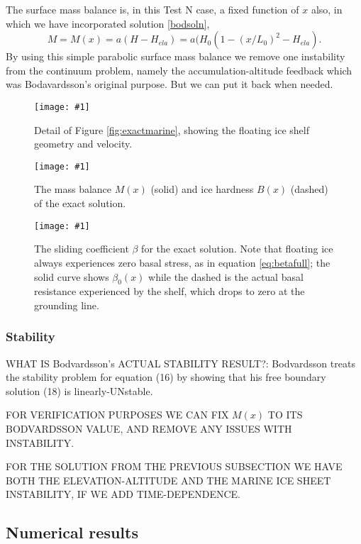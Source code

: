 \documentclass[twocolumn,letterpaper]{igs}
\newcommand{\onecol}[1]{\texttt{[image: \#1]}}
\begin{document}
The surface mass balance is, in this Test N case, a fixed function of $x$ also, in which we have incorporated solution \eqref{bodsoln},
	$$M = M(x) = a(H-H_{ela}) = a(H_0(1 - (x/L_0)^2 - H_{ela}).$$
By using this simple parabolic surface mass balance we remove one instability from the continuum problem, namely the accumulation-altitude feedback which was Bodavardsson's original purpose.  But we can put it back when needed.

\begin{figure}[ht]
\onecol{exactmarine-geometry-detail}
\caption{Detail of Figure \ref{fig:exactmarine}, showing the floating ice shelf geometry and velocity.} \label{fig:exactmarine-detail}
\end{figure}

\begin{figure}[ht]
\onecol{exactmarine-M-B}
\caption{The mass balance $M(x)$ (solid) and ice hardness $B(x)$ (dashed) of the exact solution.} \label{fig:exactMB}
\end{figure}

\begin{figure}[ht]
\onecol{exactmarine-beta}
\caption{The sliding coefficient $\beta$ for the exact solution.  Note that floating ice always experiences zero basal stress, as in equation \eqref{eq:betafull}; the solid curve shows $\beta_0(x)$ while the dashed is the actual basal resistance experienced by the shelf, which drops to zero at the grounding line.} \label{fig:exactbeta}
\end{figure}


\subsubsection*{Stability}
WHAT IS Bodvardsson's ACTUAL STABILITY RESULT?:  Bodvardsson treats the stability problem for equation (16) by showing that his free boundary solution (18) is linearly-UNstable.

FOR VERIFICATION PURPOSES WE CAN FIX $M(x)$ TO ITS BODVARDSSON VALUE, AND REMOVE ANY ISSUES WITH INSTABILITY.

FOR THE SOLUTION FROM THE PREVIOUS SUBSECTION WE HAVE BOTH THE ELEVATION-ALTITUDE AND THE MARINE ICE SHEET INSTABILITY, IF WE ADD TIME-DEPENDENCE.



\subsection*{Numerical results}
\end{document}
